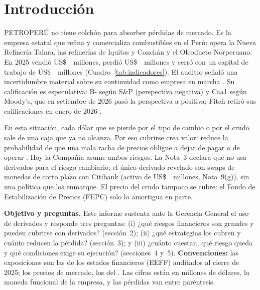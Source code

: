 
\section{Introducción}

PETROPERÚ no tiene colchón para absorber pérdidas de mercado. Es la empresa estatal que refina y comercializa
combustibles en el Perú: opera la Nueva Refinería Talara, las refinerías de Iquitos y Conchán y el Oleoducto
Norperuano. En 2025 vendió US\$~\IngresosVeinticinco\ millones, perdió US\$~\PerdidaVeinticincoAbs\ millones y cerró
con un capital de trabajo de US\$~\CapTrabajoVeinticinco\ millones (Cuadro~\ref{tab:indicadores}). El auditor señaló
una incertidumbre material sobre su continuidad como empresa en marcha \parencite{petroperu2026eeff}. Su calificación
es especulativa: B- según S\&P (perspectiva negativa) y Caa1 según Moody's, que en setiembre de 2026 pasó la
perspectiva a positiva; Fitch retiró sus calificaciones en enero de 2026
\parencite{sp2026petroperu,moodys2026petroperu,petroperu2026clasif}.

En esta situación, cada dólar que se pierde por el tipo de cambio o por el crudo sale de una caja que ya no alcanza.
Por eso cubrirse crea valor: reduce la probabilidad de que una mala racha de precios obligue a dejar de pagar o de
operar \parencite{froot1993}. Hoy la Compañía asume ambos riesgos. La Nota~3 declara que no usa derivados para el
riesgo cambiario; el único derivado revelado son swaps de monedas de corto plazo con Citibank (activo de
US\$~\SwapCiti\ millones, Nota~9(g)), sin una política que los enmarque. El precio del crudo tampoco se cubre: el
Fondo de Estabilización de Precios (FEPC) solo lo amortigua en parte.

\textbf{Objetivo y preguntas.} Este informe sustenta ante la Gerencia General el uso de derivados y responde tres
preguntas: (i) ¿qué riesgos financieros son grandes y pueden cubrirse con derivados? (sección~2); (ii) ¿qué
estrategias los cubren y cuánto reducen la pérdida? (sección~3); y (iii) ¿cuánto cuestan, qué riesgo queda y qué
condiciones exige su ejecución? (secciones~4 y~5). \textbf{Convenciones:} las exposiciones son las de los estados
financieros (EEFF) auditados al cierre de 2025; los precios de mercado, los del \FechaValorizacion. Las cifras están
en millones de dólares, la moneda funcional de la empresa, y las pérdidas van entre paréntesis.



